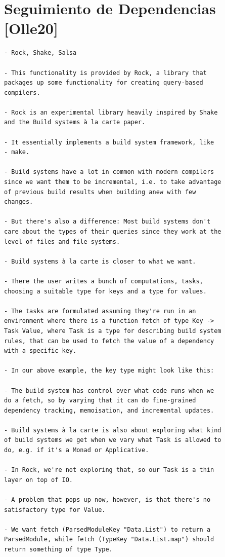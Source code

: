 \documentclass[12pt, a4paper]{report}
\begin{document}
\section*{Seguimiento de Dependencias [Olle20]}

\begin{verbatim}
- Rock, Shake, Salsa

- This functionality is provided by Rock, a library that
packages up some functionality for creating query-based
compilers.

- Rock is an experimental library heavily inspired by Shake
and the Build systems à la carte paper.

- It essentially implements a build system framework, like
- make.

- Build systems have a lot in common with modern compilers
since we want them to be incremental, i.e. to take advantage
of previous build results when building anew with few
changes.

- But there's also a difference: Most build systems don't
care about the types of their queries since they work at the
level of files and file systems.

- Build systems à la carte is closer to what we want.

- There the user writes a bunch of computations, tasks,
choosing a suitable type for keys and a type for values.

- The tasks are formulated assuming they're run in an
environment where there is a function fetch of type Key ->
Task Value, where Task is a type for describing build system
rules, that can be used to fetch the value of a dependency
with a specific key.

- In our above example, the key type might look like this:

- The build system has control over what code runs when we
do a fetch, so by varying that it can do fine-grained
dependency tracking, memoisation, and incremental updates.

- Build systems à la carte is also about exploring what kind
of build systems we get when we vary what Task is allowed to
do, e.g. if it's a Monad or Applicative.

- In Rock, we're not exploring that, so our Task is a thin
layer on top of IO.

- A problem that pops up now, however, is that there's no
satisfactory type for Value.

- We want fetch (ParsedModuleKey "Data.List") to return a
ParsedModule, while fetch (TypeKey "Data.List.map") should
return something of type Type.
\end{verbatim}
\cite{olle_query_based}
\end{document}

